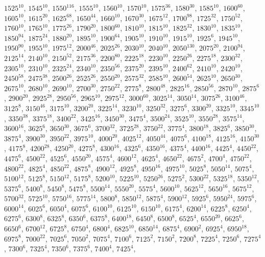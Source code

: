 \begin{itemize}
$1525^{10}$, $1545^{10}$, $1550^{116}$, $1555^{10}$, $1560^{10}$, $1570^{10}$, $1575^{36}$, $1580^{30}$, $1585^{10}$, $1600^{60}$, $1605^{10}$, $1615^{20}$, $1625^{68}$, $1650^{44}$, $1660^{10}$, $1670^{30}$, $1675^{12}$, $1700^{98}$, $1725^{32}$, $1750^{52}$, $1760^{10}$, $1765^{10}$, $1775^{26}$, $1790^{20}$, $1800^{60}$, $1810^{10}$, $1815^{10}$, $1825^{32}$, $1830^{10}$, $1835^{10}$, $1850^{94}$, $1875^{24}$, $1880^{20}$, $1895^{10}$, $1900^{64}$, $1905^{10}$, $1910^{10}$, $1915^{10}$, $1925^{6}$, $1945^{10}$, $1950^{90}$, $1955^{10}$, $1975^{12}$, $2000^{46}$, $2025^{26}$, $2030^{10}$, $2040^{10}$, $2050^{130}$, $2075^{20}$, $2100^{94}$, $2125^{14}$, $2140^{10}$, $2150^{52}$, $2175^{36}$, $2200^{80}$, $2225^{18}$, $2230^{10}$, $2250^{26}$, $2275^{18}$, $2300^{32}$, $2305^{10}$, $2310^{10}$, $2325^{24}$, $2340^{10}$, $2350^{56}$, $2375^{20}$, $2395^{10}$, $2400^{62}$, $2410^{10}$, $2420^{10}$, $2450^{58}$, $2475^{38}$, $2500^{26}$, $2525^{26}$, $2550^{20}$, $2575^{32}$, $2585^{10}$, $2600^{54}$, $2625^{10}$, $2650^{30}$, $2675^{10}$, $2680^{10}$, $2690^{10}$, $2700^{30}$, $2750^{22}$, $2775^{8}$, $2800^{48}$, $2825^{16}$, $2850^{56}$, $2870^{10}$, $2875^{6}$, $2900^{20}$, $2925^{28}$, $2950^{56}$, $2965^{10}$, $2975^{12}$, $3000^{60}$, $3025^{14}$, $3050^{14}$, $3075^{26}$, $3100^{46}$, $3125^{8}$, $3150^{46}$, $3175^{10}$, $3200^{20}$, $3225^{14}$, $3230^{10}$, $3250^{32}$, $3275^{6}$, $3300^{20}$, $3325^{10}$, $3345^{10}$, $3350^{38}$, $3375^{18}$, $3400^{22}$, $3425^{16}$, $3450^{30}$, $3475^{4}$, $3500^{24}$, $3525^{10}$, $3550^{28}$, $3575^{14}$, $3600^{16}$, $3625^{6}$, $3650^{30}$, $3675^{6}$, $3700^{32}$, $3725^{28}$, $3750^{22}$, $3775^{4}$, $3800^{18}$, $3825^{6}$, $3850^{30}$, $3875^{4}$, $3900^{30}$, $3950^{22}$, $3975^{10}$, $4000^{20}$, $4025^{12}$, $4050^{44}$, $4075^{6}$, $4100^{18}$, $4125^{16}$, $4150^{30}$, $4175^{8}$, $4200^{28}$, $4250^{20}$, $4275^{8}$, $4300^{16}$, $4325^{6}$, $4350^{16}$, $4375^{4}$, $4400^{16}$, $4425^{4}$, $4450^{22}$, $4475^{6}$, $4500^{22}$, $4525^{6}$, $4550^{20}$, $4575^{4}$, $4600^{12}$, $4625^{4}$, $4650^{22}$, $4675^{2}$, $4700^{4}$, $4750^{22}$, $4800^{22}$, $4825^{4}$, $4850^{22}$, $4875^{8}$, $4900^{12}$, $4925^{8}$, $4950^{16}$, $4975^{10}$, $5025^{8}$, $5050^{14}$, $5075^{4}$, $5100^{12}$, $5125^{8}$, $5150^{12}$, $5175^{8}$, $5200^{10}$, $5225^{10}$, $5250^{26}$, $5275^{2}$, $5300^{22}$, $5325^{18}$, $5350^{12}$, $5375^{6}$, $5400^{8}$, $5450^{8}$, $5475^{8}$, $5500^{14}$, $5550^{20}$, $5575^{4}$, $5600^{10}$, $5625^{12}$, $5650^{16}$, $5675^{12}$, $5700^{32}$, $5725^{10}$, $5750^{16}$, $5775^{14}$, $5800^{8}$, $5850^{12}$, $5875^{4}$, $5900^{12}$, $5925^{6}$, $5950^{24}$, $5975^{6}$, $6000^{14}$, $6025^{6}$, $6050^{4}$, $6075^{6}$, $6100^{10}$, $6125^{10}$, $6150^{10}$, $6175^{4}$, $6200^{14}$, $6225^{8}$, $6250^{4}$, $6275^{6}$, $6300^{8}$, $6325^{8}$, $6350^{6}$, $6375^{8}$, $6400^{18}$, $6450^{8}$, $6500^{8}$, $6525^{4}$, $6550^{20}$, $6625^{6}$, $6650^{6}$, $6700^{12}$, $6725^{8}$, $6750^{4}$, $6800^{4}$, $6825^{10}$, $6850^{14}$, $6875^{4}$, $6900^{2}$, $6925^{4}$, $6950^{18}$, $6975^{8}$, $7000^{22}$, $7025^{6}$, $7050^{2}$, $7075^{4}$, $7100^{6}$, $7125^{2}$, $7150^{2}$, $7200^{8}$, $7225^{4}$, $7250^{6}$, $7275^{4}$, $7300^{6}$, $7325^{4}$, $7350^{6}$, $7375^{6}$, $7400^{4}$, $7425^{4}$, 
\end{itemize}
